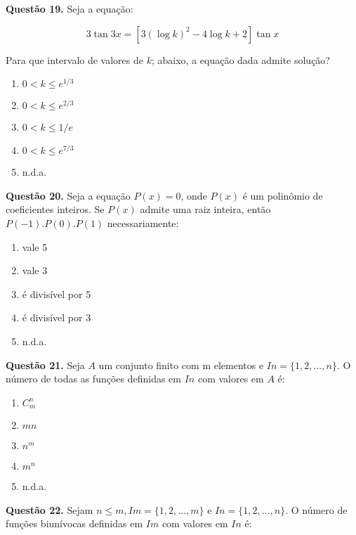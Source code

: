 \documentclass[11pt]{article}
\begin{document}
\textbf{Questão 19.} Seja a equação: 

$$
3 \tan 3x = [3(\log k)^2 - 4\log k + 2] \tan x
$$

Para  que  intervalo  de  valores  de  $k$;  abaixo,  a  equação  dada admite solução?

\begin{multicols}{3}
    \begin{enumerate}[\bf A (\quad)]
        \item $0 < k \leq e^{1/3}$
        \item $0 < k \leq e^{2/3}$
        \item $0 < k \leq 1/e$
        \item $0 < k \leq e^{7/3}$
        \item n.d.a.
    \end{enumerate}
\end{multicols}

\textbf{Questão 20.} Seja a equação $P(x) = 0$, onde $P(x)$ é um polinômio de coeficientes inteiros.   Se   $P(x)$   admite   uma   raiz   inteira,   então   $P(-1).P(0).P(1)$ necessariamente: 

\begin{enumerate}[\bf A (\quad)]
    \item vale 5
    \item vale 3
    \item é divisível por 5
    \item é divisível por 3
    \item n.d.a.
\end{enumerate}

\textbf{Questão 21.} Seja $A$ um conjunto finito com m elementos e $In = \{1, 2,  ...,  n\}$.  O  número  de  todas  as  funções  definidas  em  $In$ com valores em $A$ é:

\begin{multicols}{3}
    \begin{enumerate}[\bf A (\quad)]
        \item $C_m^n$
        \item $mn$
        \item $n^m$
        \item $m^n$
        \item n.d.a.
    \end{enumerate}
\end{multicols}

\textbf{Questão 22.} Sejam $n \leq m , Im = \{1, 2, ..., m\}$ e $In =\{1, 2, ..., n\}$. O número   de   funções   biunívocas   definidas   em   $Im$   com   valores em $In$ é: 
\end{document}

